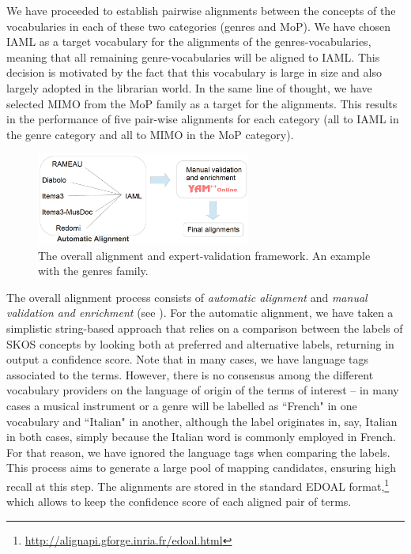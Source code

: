 \documentclass{article}
\begin{document}
We have proceeded to establish pairwise alignments between the concepts of the vocabularies in each of these two categories (genres and MoP). We have chosen IAML as a target vocabulary for the alignments of the genres-vocabularies, meaning that all remaining genre-vocabularies will be aligned to IAML. This decision is motivated by the fact that this vocabulary is large in size and also largely adopted in the librarian world. In the same line of thought, we have selected MIMO from the MoP family as a target for the alignments. This results in the performance of five pair-wise alignments for each category (all to IAML in the genre category and all to MIMO in the MoP category).

\begin{figure}[h]
	\centering
		\includegraphics[width=7cm]{figs/pipeline.png}
	\caption{The overall alignment and expert-validation framework. An example with the genres family.}
	\label{fig:alignPipeline}
\end{figure}

The overall alignment process consists of {\it automatic alignment} and {\it manual validation and enrichment} (see ). For the automatic alignment, we have taken a simplistic string-based approach that relies on a comparison between the labels of SKOS concepts by looking both at preferred and alternative labels, returning in output a confidence score. Note that in many cases, we have language tags associated to the terms. However, there is no consensus among the different vocabulary providers on the language of origin of the terms of interest -- in many cases a  musical instrument or a genre will be labelled as ``French" in one vocabulary and ``Italian" in another, although the label originates in, say, Italian in both cases, simply because the Italian word is commonly employed in French. For that reason, we have ignored the language tags when comparing the labels. This process aims to generate a large pool of mapping candidates, ensuring high recall at this step. The alignments are stored in the standard EDOAL format,\footnote{\url{http://alignapi.gforge.inria.fr/edoal.html}} which allows to keep the confidence score of each aligned pair of terms.
\end{document}
